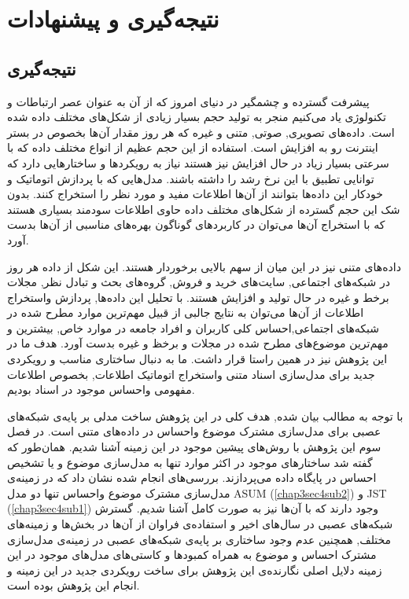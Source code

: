 \chapter{نتیجه‌گیری و پیشنهادات}
\thispagestyle{empty}
\section{نتیجه‌گیری}
پیشرفت گسترده و چشمگیر در دنیای امروز که از آن به عنوان عصر ارتباطات و تکنولوژی یاد می‌کنیم منجر به تولید حجم بسيار زیادی از شکل‌های مختلف داده شده است. داده‌های تصویری, صوتی, متنی و غیره که هر روز مقدار آن‌ها بخصوص در بستر اینترنت رو به افزایش است. استفاده از این حجم عظیم از انواع مختلف داده که با سرعتی بسيار زیاد در حال افزایش نیز هستند نیاز به رویکردها و ساختارهایی دارد که توانایی تطبیق با این نرخ رشد را داشته باشند. مدل‌هایی که با پردازش اتوماتیک و خودکار این داده‌ها بتوانند از آن‌ها اطلاعات مفید و مورد نظر را استخراج کنند. بدون شک این حجم گسترده از شکل‌های مختلف داده حاوی اطلاعات سودمند بسياری هستند که با استخراج آن‌ها می‌توان در کاربردهای گوناگون بهره‌های مناسبی از آن‌ها بدست آورد. 

داده‌های متنی نیز در این میان از سهم بالایی برخوردار هستند. این شکل از داده هر روز در شبکه‌های اجتماعی, سایت‌های خرید و فروش, گروه‌های بحث و تبادل نظر, مجلات برخط و غیره در حال تولید و افزایش هستند. با تحلیل این داده‌ها, پردازش واستخراج اطلاعات از آن‌ها می‌توان به نتایج جالبی از قبیل مهم‌ترین موارد مطرح شده در شبکه‌های اجتماعی,احساس کلی کاربران و افراد جامعه در موارد خاص, بیشترین و مهم‌ترین موضوع‌های مطرح شده در مجلات و برخظ و غیره بدست آورد. هدف ما در این پژوهش نیز در همین راستا قرار داشت. ما به دنبال ساختاری مناسب و رویکردی جدید برای مدل‌سازی اسناد متنی واستخراج اتوماتیک اطلاعات, بخصوص اطلاعات مفهومی واحساس موجود در اسناد بودیم.

با توجه به مطالب بیان شده, هدف کلی در این پژوهش ساخت مدلی بر پایه‌ی شبکه‌های عصبی برای مدل‌سازی مشترک موضوع واحساس در داده‌های متنی است. در فصل سوم این پژوهش با روش‌های پیشین موجود در این زمینه آشنا شدیم. همان‌طور که گفته شد ساختارهای موجود در اکثر موارد تنها به مدل‌سازی موضوع و یا تشخیص احساس در پایگاه داده می‌پردازند. بررسی‌های انجام شده نشان داد که در زمینه‌ی مدل‌سازی مشترک موضوع واحساس تنها دو مدل
ASUM (\ref{chap3sec4sub2})
و 
JST (\ref{chap3sec4sub1})
وجود دارند که با آن‌ها نیز به صورت کامل آشنا شدیم. گسترش شبکه‌های عصبی در سال‌های اخیر و استفاده‌ی فراوان از آن‌ها در بخش‌ها و زمینه‌های مختلف, همچنین عدم وجود ساختاری بر پایه‌ی شبکه‌های عصبی در زمینه‌ی مدل‌سازی مشترک احساس و موضوع به همراه کمبودها و کاستی‌های مدل‌های موجود در این زمینه دلایل اصلی نگارند‌ه‌ی این پژوهش برای ساخت رویکردی جدید در این زمینه و انجام این پژوهش بوده است.

